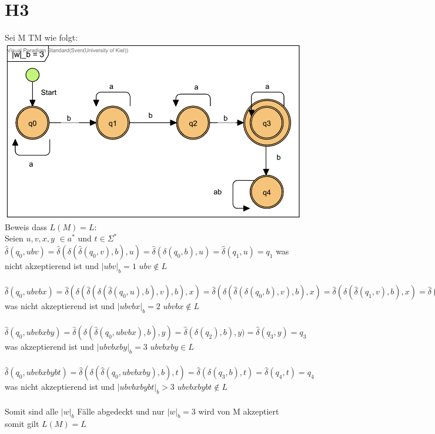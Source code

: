 \section*{H3}
Sei M TM wie folgt:\\
\includegraphics[scale=0.8]{part/TGIS08A03}
Beweis dass  $L(M)=L$:\\
Seien $u,v,x,y$ $\in a^* $ und $t \in \Sigma^*$\\
$\hat{\delta}(q_0,ubv)= \hat{\delta}(\delta (\hat{ \delta} (q_0,v),b), u) = \hat{\delta}(\delta (q_0,b), u) = \hat{\delta}(q_1, u) = q_1$ was nicht akzeptierend ist und $|ubv|_b=1$ $ubv\notin L$\\
\\
$\hat{\delta}(q_0,ubvbx)=\hat{\delta} ( \delta( \hat{\delta}(\delta (\hat{ \delta} (q_0,u),b), v),b),x) =\hat{\delta} ( \delta( \hat{\delta}(\delta (q_0,b), v),b),x) =\hat{\delta} ( \delta( \hat{\delta}(q_1, v),b),x) = \hat{\delta} ( \delta( q_1,b),x) = \hat{\delta} ( q_2),x) = q_2 $ was nicht akzeptierend ist und $|ubvbx|_b=2$ $ubvbx\notin L$\\
\\
$\hat{\delta}(q_0,ubvbxby)=\hat{\delta} ( \delta(\hat{ \delta} (q_0,ubvbx),b),y) = \hat{\delta}(\delta ( q_2),b),y) =\hat{\delta}(q_3,y)= q_3 $ was akzeptierend ist und $|ubvbxby|_b=3$ $ubvbxby\in L$\\
\\
$\hat{\delta}(q_0,ubvbxbybt)=\hat{\delta}(\delta ( \hat{\delta}(q_0,ubvbxby),b),t)=\hat{\delta}(\delta (q_3,b),t)=\hat{\delta}(q_4,t) = q_4  $ was nicht akzeptierend ist und $|ubvbxbybt|_b>3$ $ubvbxbybt\notin L$\\
\\
Somit sind alle $|w|_b$ Fälle abgedeckt und nur $|w|_b=3$ wird von M akzeptiert somit gilt $L(M)=L$


